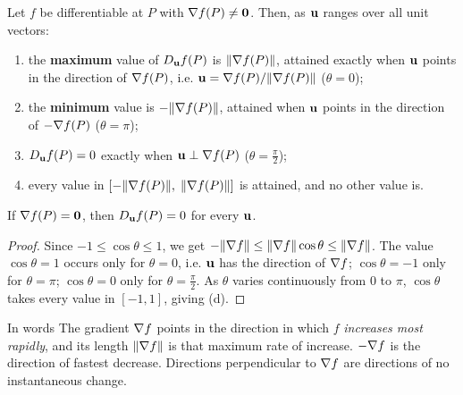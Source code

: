 \begin{theorem}\label{thm:max}
Let $f$ be differentiable at $P$ with $\nabla f(P)\neq\mathbf{0}$. Then, as $\mathbf{u}$
ranges over all unit vectors:
\begin{enumerate}[label=(\alph*)]
  \item the \textbf{maximum} value of $D_{\mathbf{u}} f(P)$ is $\lVert\nabla f(P)\rVert$, attained
        exactly when $\mathbf{u}$ points in the direction of $\nabla f(P)$, i.e.
        $\mathbf{u}=\nabla f(P)/\lVert\nabla f(P)\rVert$ ($\theta=0$);
  \item the \textbf{minimum} value is $-\lVert\nabla f(P)\rVert$, attained when $\mathbf{u}$
        points in the direction of $-\nabla f(P)$ ($\theta=\pi$);
  \item $D_{\mathbf{u}} f(P)=0$ exactly when $\mathbf{u}\perp\nabla f(P)$ ($\theta=\frac\pi2$);
  \item every value in $\left[-\lVert\nabla f(P)\rVert,\;\lVert\nabla f(P)\rVert\right]$ is
        attained, and no other value is.
\end{enumerate}
If $\nabla f(P)=\mathbf{0}$, then $D_{\mathbf{u}} f(P)=0$ for every $\mathbf{u}$.
\end{theorem}

\begin{proof}
Since $-1\le\cos\theta\le1$, we get
$-\lVert\nabla f\rVert\le\lVert\nabla f\rVert\cos\theta\le\lVert\nabla f\rVert$. The value
$\cos\theta=1$ occurs only for $\theta=0$, i.e. $\mathbf{u}$ has the direction of
$\nabla f$; $\cos\theta=-1$ only for $\theta=\pi$; $\cos\theta=0$ only for
$\theta=\frac\pi2$. As $\theta$ varies continuously from $0$ to $\pi$,
$\cos\theta$ takes every value in $[-1,1]$, giving (d).
\end{proof}

\begin{keybox}{In words}
The gradient $\nabla f$ points in the direction in which $f$ \emph{increases
most rapidly}, and its length $\lVert\nabla f\rVert$ is that maximum rate of
increase. $-\nabla f$ is the direction of fastest decrease. Directions
perpendicular to $\nabla f$ are directions of no instantaneous change.
\end{keybox}

